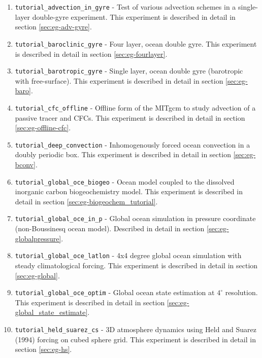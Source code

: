 \begin{enumerate}
  
\item \texttt{tutorial\_advection\_in\_gyre} - Test of various
  advection schemes in a single-layer double-gyre experiment.
  This experiment is described in detail in section
  \ref{sec:eg-adv-gyre}.

\item \texttt{tutorial\_baroclinic\_gyre} - Four layer, ocean double
  gyre. This experiment is described in detail in section
  \ref{sec:eg-fourlayer}.

\item \texttt{tutorial\_barotropic\_gyre} - Single layer, ocean double
  gyre (barotropic with free-surface). 
  This experiment is described in detail in section \ref{sec:eg-baro}.

\item \texttt{tutorial\_cfc\_offline} - Offline form of the MITgcm to
  study advection of a passive tracer and CFCs.
  This experiment is described in detail in section \ref{sec:eg-offline-cfc}.

\item \texttt{tutorial\_deep\_convection} - Inhomogenously forced
  ocean convection in a doubly periodic box. This experiment is
  described in detail in section \ref{sec:eg-bconv}.

\item \texttt{tutorial\_global\_oce\_biogeo} - Ocean model coupled to
  the dissolved inorganic carbon biogeochemistry model. This
  experiment is described in detail in section
  \ref{sec:eg-biogeochem_tutorial}.

\item \texttt{tutorial\_global\_oce\_in\_p} - Global ocean simulation in
  pressure coordinate (non-Boussinesq ocean model). Described in
  detail in section \ref{sec:eg-globalpressure}.

\item \texttt{tutorial\_global\_oce\_latlon} - 4x4 degree global ocean
  simulation with steady climatological forcing. This experiment is
  described in detail in section \ref{sec:eg-global}.

\item \texttt{tutorial\_global\_oce\_optim} - Global ocean state
  estimation at $4^\circ$ resolution.  This experiment is described in
  detail in section \ref{sec:eg-global_state_estimate}.

\item \texttt{tutorial\_held\_suarez\_cs} - 3D atmosphere dynamics
  using Held and Suarez (1994) forcing on cubed sphere grid.  This
  experiment is described in detail in section \ref{sec:eg-hs}.
  

\end{enumerate}
